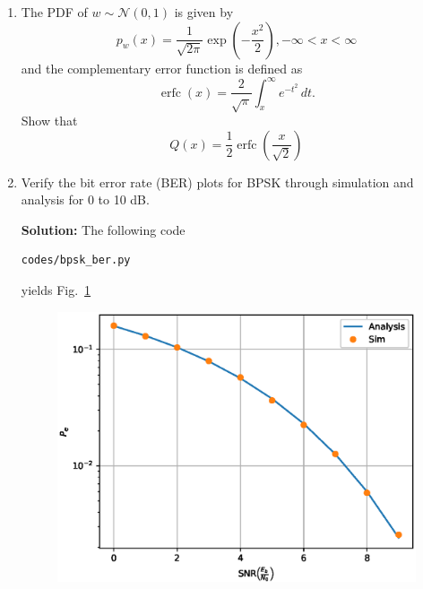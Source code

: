 \documentclass[journal,10pt,twocolumn]{IEEEtran}
\newcommand\figref{Fig.~\ref}
\providecommand{\pr}[1]{\ensuremath{\Pr\left(#1\right)}}
\providecommand{\qfunc}[1]{\ensuremath{Q\left(#1\right)}}
\providecommand{\brak}[1]{\ensuremath{\left(#1\right)}}
\newcommand{\solution}{\noindent \textbf{Solution: }}
\providecommand{\gauss}[2]{\mathcal{N}\ensuremath{\left(#1,#2\right)}}
\begin{document}
\begin{enumerate}
\solution
Since the symbols are equiprobable, it is sufficient if the error is calculated assuming that a 0 was sent.  This results in
\begin{align}
P_e &= \pr{y < 0|s_0} = \pr{\sqrt{E_b} + n < 0}
\\
&= \pr{ -n > \sqrt{E_b} } = \pr{ n > \sqrt{E_b} }
\label{eq:bpsk_proof_n0}
\end{align}
since $n$ has a symmetric pdf.
Let $w \sim \gauss{0}{1}$.  Then $n = \sqrt{\frac{N_0}{2}}w$. Substituting this in \eqref{eq:bpsk_proof_n0},
\begin{align}
P_e &=  \pr{ \sqrt{\frac{N_0}{2}}w > \sqrt{E_b} } = \pr{ w > \sqrt{\frac{2E_b}{N_0}} }
\\
&= \qfunc{\sqrt{\frac{2E_b}{N_0}}}
\end{align}
%
where $\qfunc{x} \triangleq \pr{w > x}, x \ge 0$.
\item
The PDF of $w \sim \gauss{0}{1}$ is given by
%
\begin{equation}
p_{w}(x) = \frac{1}{\sqrt{2\pi}}\exp\brak{-\frac{x^2}{2}}, -\infty < x < \infty
\end{equation}
and the complementary error function is defined as
\begin{equation}
\operatorname {erfc} (x)={\frac {2}{\sqrt {\pi }}}\int _{x}^{\infty }e^{-t^{2}}\,dt.
\end{equation}
%
Show that 
\begin{equation}
Q(x) = \frac{1}{2}\operatorname {erfc}\left({\frac  {x}{{\sqrt  {2}}}}\right)
\end{equation}

\item
Verify the bit error rate (BER) plots for BPSK through simulation and analysis for 0 to 10 dB.

\solution
The following code
%
\begin{lstlisting}
codes/bpsk_ber.py
\end{lstlisting}
yields \figref{fig:bpsk_ber}
\begin{figure}[H]
\centering
\includegraphics[width=\columnwidth]{./figs/chapter6/bpsk_ber.eps}
\caption{}
\label{fig:bpsk_ber}
\end{figure}


\end{enumerate}
\end{document}
